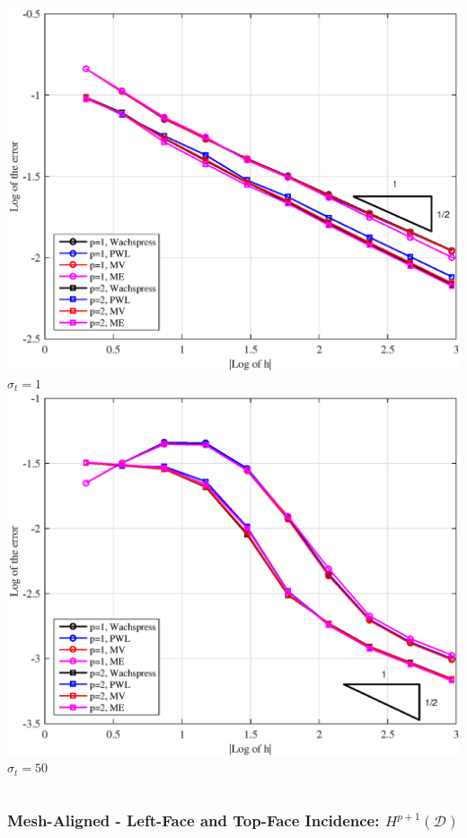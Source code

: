 \documentclass[compress,10pt]{beamer}
\begin{document}
\begin{frame}[t]
{\begin{columns}[c]
{}\includegraphics[width=\textwidth]{images/PAErr_Left_Poly_sig1.eps} \\
$\sigma_t = 1$
\centering
{}\includegraphics[width=\textwidth]{images/PAErr_Left_Poly_sig50.eps} \\
$\sigma_t = 50$
\end{columns}
}
{
\frametitle{Mesh-Aligned - Left-Face and Top-Face Incidence: $H^{p+1} (\mathcal{D})$}
\vspace{1.00cm}
\begin{columns}[c]
\centering

\end{columns}}
\end{frame}
\end{document}
